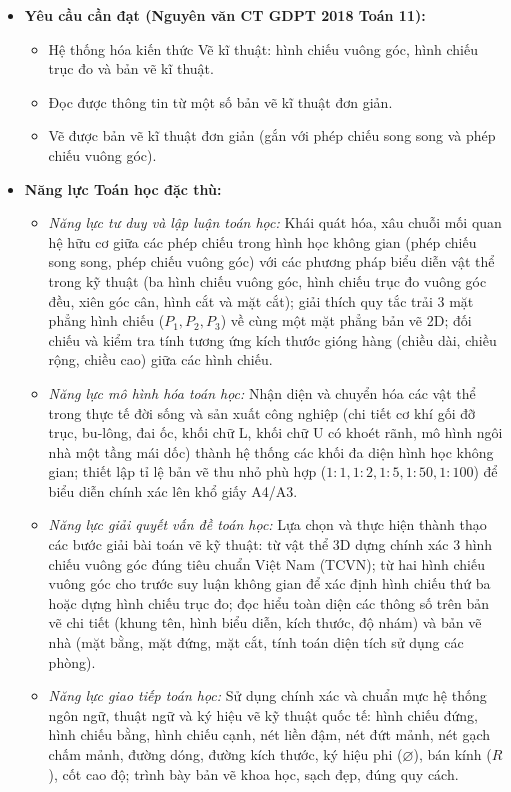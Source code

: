\documentclass[12pt, a4paper]{article}
\begin{document}
\begin{itemize}[leftmargin=1.2cm]
    \item \textbf{Yêu cầu cần đạt (Nguyên văn CT GDPT 2018 Toán 11):}
    \begin{itemize}[leftmargin=0.6cm]
        \item Hệ thống hóa kiến thức Vẽ kĩ thuật: hình chiếu vuông góc, hình chiếu trục đo và bản vẽ kĩ thuật.
        \item Đọc được thông tin từ một số bản vẽ kĩ thuật đơn giản.
        \item Vẽ được bản vẽ kĩ thuật đơn giản (gắn với phép chiếu song song và phép chiếu vuông góc).
    \end{itemize}

    \item \textbf{Năng lực Toán học đặc thù:}
    \begin{itemize}[leftmargin=0.6cm]
        \item \textit{Năng lực tư duy và lập luận toán học:} Khái quát hóa, xâu chuỗi mối quan hệ hữu cơ giữa các phép chiếu trong hình học không gian (phép chiếu song song, phép chiếu vuông góc) với các phương pháp biểu diễn vật thể trong kỹ thuật (ba hình chiếu vuông góc, hình chiếu trục đo vuông góc đều, xiên góc cân, hình cắt và mặt cắt); giải thích quy tắc trải 3 mặt phẳng hình chiếu ($P_1, P_2, P_3$) về cùng một mặt phẳng bản vẽ 2D; đối chiếu và kiểm tra tính tương ứng kích thước gióng hàng (chiều dài, chiều rộng, chiều cao) giữa các hình chiếu.
        \item \textit{Năng lực mô hình hóa toán học:} Nhận diện và chuyển hóa các vật thể trong thực tế đời sống và sản xuất công nghiệp (chi tiết cơ khí gối đỡ trục, bu-lông, đai ốc, khối chữ L, khối chữ U có khoét rãnh, mô hình ngôi nhà một tầng mái dốc) thành hệ thống các khối đa diện hình học không gian; thiết lập tỉ lệ bản vẽ thu nhỏ phù hợp ($1:1, 1:2, 1:5, 1:50, 1:100$) để biểu diễn chính xác lên khổ giấy A4/A3.
        \item \textit{Năng lực giải quyết vấn đề toán học:} Lựa chọn và thực hiện thành thạo các bước giải bài toán vẽ kỹ thuật: từ vật thể 3D dựng chính xác 3 hình chiếu vuông góc đúng tiêu chuẩn Việt Nam (TCVN); từ hai hình chiếu vuông góc cho trước suy luận không gian để xác định hình chiếu thứ ba hoặc dựng hình chiếu trục đo; đọc hiểu toàn diện các thông số trên bản vẽ chi tiết (khung tên, hình biểu diễn, kích thước, độ nhám) và bản vẽ nhà (mặt bằng, mặt đứng, mặt cắt, tính toán diện tích sử dụng các phòng).
        \item \textit{Năng lực giao tiếp toán học:} Sử dụng chính xác và chuẩn mực hệ thống ngôn ngữ, thuật ngữ và ký hiệu vẽ kỹ thuật quốc tế: hình chiếu đứng, hình chiếu bằng, hình chiếu cạnh, nét liền đậm, nét đứt mảnh, nét gạch chấm mảnh, đường dóng, đường kích thước, ký hiệu phi ($\varnothing$), bán kính ($R$), cốt cao độ; trình bày bản vẽ khoa học, sạch đẹp, đúng quy cách.

\end{itemize}
\end{itemize}
\end{document}
